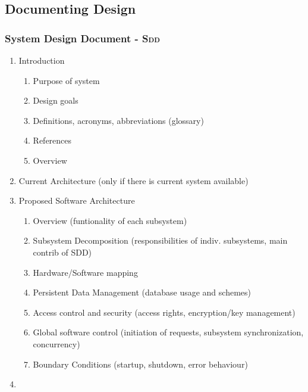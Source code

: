 \documentclass[a4paper, 10pt]{article}
\begin{document}
\subsection{Documenting Design}
\subsubsection{System Design Document - \textsc{Sdd}}
\begin{enumerate}
	\item Introduction
	\begin{enumerate}
		\item Purpose of system
		\item Design goals
		\item Definitions, acronyms, abbreviations (glossary)
		\item References
		\item Overview
	\end{enumerate}
	\item Current Architecture (only if there is current system available)
	\item Proposed Software Architecture
	\begin{enumerate}
		\item Overview (funtionality of each subsystem)
		\item Subsystem Decomposition (responsibilities of indiv. subsystems, main contrib of SDD)
		\item Hardware/Software mapping
		\item Persistent Data Management (database usage and schemes)
		\item Access control and security (access rights, encryption/key management)
		\item Global software control (initiation of requests, subsystem synchronization, concurrency)
		\item Boundary Conditions (startup, shutdown, error behaviour)
	\end{enumerate}
	\item 
\end{enumerate}
\end{document}
